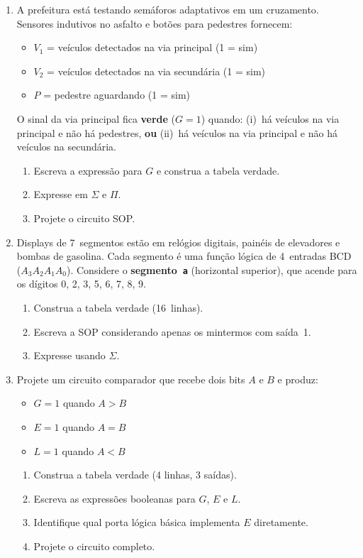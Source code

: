 \documentclass[11pt, a4paper]{article}
\begin{document}
\begin{enumerate}
\item A prefeitura est\'{a} testando sem\'{a}foros adaptativos em um cruzamento. Sensores indutivos no asfalto e bot\~{o}es para pedestres fornecem:
\begin{itemize}
  \item $V_1$ = ve\'{i}culos detectados na via principal (1 = sim)
  \item $V_2$ = ve\'{i}culos detectados na via secund\'{a}ria (1 = sim)
  \item $P$ = pedestre aguardando (1 = sim)
\end{itemize}
O sinal da via principal fica \textbf{verde} ($G = 1$) quando: (i)~h\'{a} ve\'{i}culos na via principal e n\~{a}o h\'{a} pedestres, \textbf{ou} (ii)~h\'{a} ve\'{i}culos na via principal e n\~{a}o h\'{a} ve\'{i}culos na secund\'{a}ria.
\begin{enumerate}
  \item Escreva a express\~{a}o para $G$ e construa a tabela verdade.
  \item Expresse em $\Sigma$ e $\Pi$.
  \item Projete o circuito SOP.
\end{enumerate}

\item Displays de 7~segmentos est\~{a}o em rel\'{o}gios digitais, pain\'{e}is de elevadores e bombas de gasolina. Cada segmento \'{e} uma fun\c{c}\~{a}o l\'{o}gica de 4~entradas BCD ($A_3 A_2 A_1 A_0$). Considere o \textbf{segmento~\texttt{a}} (horizontal superior), que acende para os d\'{i}gitos 0, 2, 3, 5, 6, 7, 8, 9.
\begin{enumerate}
  \item Construa a tabela verdade (16~linhas).
  \item Escreva a SOP considerando apenas os mintermos com sa\'{i}da~1.
  \item Expresse usando $\Sigma$.
\end{enumerate}

\item Projete um circuito comparador que recebe dois bits $A$ e $B$ e produz:
\begin{itemize}
  \item $G = 1$ quando $A > B$
  \item $E = 1$ quando $A = B$
  \item $L = 1$ quando $A < B$
\end{itemize}
\begin{enumerate}
  \item Construa a tabela verdade (4 linhas, 3 sa\'{i}das).
  \item Escreva as express\~{o}es booleanas para $G$, $E$ e $L$.
  \item Identifique qual porta l\'{o}gica b\'{a}sica implementa $E$ diretamente.
  \item Projete o circuito completo.
\end{enumerate}


\end{enumerate}
\end{document}
